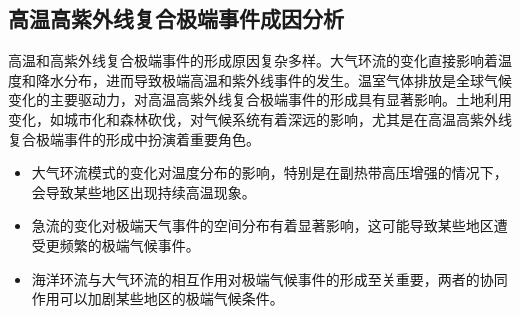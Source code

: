\documentclass[12pt]{article}
\begin{document}
\subsection{高温高紫外线复合极端事件成因分析}
高温和高紫外线复合极端事件的形成原因复杂多样。大气环流的变化直接影响着温度和降水分布，进而导致极端高温和紫外线事件的发生。温室气体排放是全球气候变化的主要驱动力，对高温高紫外线复合极端事件的形成具有显著影响。土地利用变化，如城市化和森林砍伐，对气候系统有着深远的影响，尤其是在高温高紫外线复合极端事件的形成中扮演着重要角色。

\begin{itemize}
\item 大气环流模式的变化对温度分布的影响，特别是在副热带高压增强的情况下，会导致某些地区出现持续高温现象。
\item 急流的变化对极端天气事件的空间分布有着显著影响，这可能导致某些地区遭受更频繁的极端气候事件。
\item 海洋环流与大气环流的相互作用对极端气候事件的形成至关重要，两者的协同作用可以加剧某些地区的极端气候条件。
\end{itemize}
\end{document}
